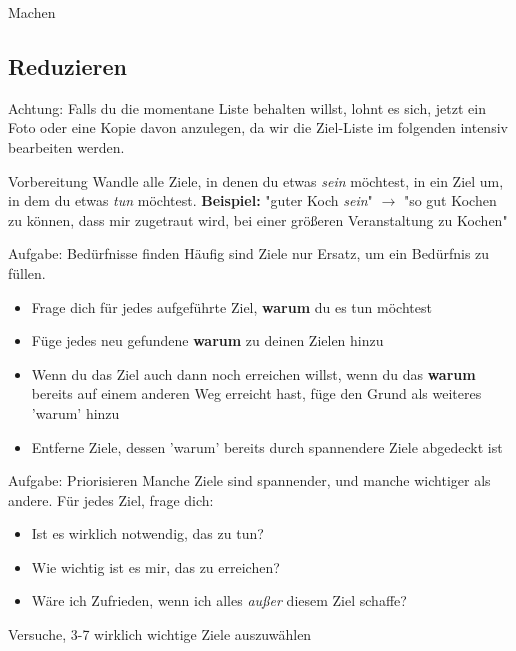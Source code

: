 \addtocounter{framenumber}{1}
\begin{frame}[standout]
    Machen
\end{frame}


\subsection{Reduzieren}

\addtocounter{framenumber}{1}
\begin{frame}[standout]
    \LARGE
    Achtung: Falls du die momentane Liste behalten willst, lohnt es sich, jetzt
    ein Foto oder eine Kopie davon anzulegen, da wir die Ziel-Liste im
    folgenden intensiv bearbeiten werden.
\end{frame}

\begin{frame}[c]{Vorbereitung}
    \Large
    Wandle alle Ziele, in denen du etwas {\em sein} möchtest, in ein Ziel um,
    in dem du etwas {\em tun} möchtest. \newline \newline \pause
    \textbf{Beispiel:} "guter Koch {\em sein}" $\rightarrow$ "so gut Kochen zu
    können, dass mir zugetraut wird, bei einer größeren Veranstaltung zu Kochen"
\end{frame}

\begin{frame}[c]{Aufgabe: Bedürfnisse finden}
    \normalsize
    Häufig sind Ziele nur Ersatz, um ein Bedürfnis zu füllen.
    \begin{itemize}[<+(1)->]
        \item Frage dich für jedes aufgeführte Ziel, \textbf{warum} du es tun möchtest
        \item Füge jedes neu gefundene \textbf{warum} zu deinen Zielen hinzu
        \item Wenn du das Ziel auch dann noch erreichen willst, wenn du das
            \textbf{warum} bereits auf einem anderen Weg erreicht hast, füge
            den Grund als weiteres 'warum' hinzu
        \item Entferne Ziele, dessen 'warum' bereits durch spannendere Ziele abgedeckt ist
    \end{itemize}
\end{frame}


\begin{frame}[c]{Aufgabe: Priorisieren}
    Manche Ziele sind spannender, und manche wichtiger als andere. Für jedes
    Ziel, frage dich:
    \begin{itemize}[<+(1)->]
        \item Ist es wirklich notwendig, das zu tun?
        \item Wie wichtig ist es mir, das zu erreichen?
        \item Wäre ich Zufrieden, wenn ich alles {\em außer} diesem Ziel schaffe?
    \end{itemize} \pause
    Versuche, 3-7 wirklich wichtige Ziele auszuwählen
\end{frame}
